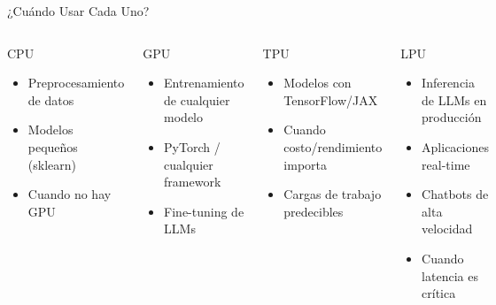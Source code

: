 \documentclass[aspectratio=169]{beamer}
\begin{document}
\begin{frame}{¿Cuándo Usar Cada Uno?}
    \begin{columns}[t]
        \begin{block}{CPU \faServer}
            \begin{itemize}
                \item Preprocesamiento de datos
                \item Modelos pequeños (sklearn)
                \item Cuando no hay GPU
            \end{itemize}
        \end{block}
        
        \begin{block}{GPU \faMicrochip}
            \begin{itemize}
                \item Entrenamiento de cualquier modelo
                \item PyTorch / cualquier framework
                \item Fine-tuning de LLMs
            \end{itemize}
        \end{block}
        
        \begin{block}{TPU \faGoogle}
            \begin{itemize}
                \item Modelos con TensorFlow/JAX
                \item Cuando costo/rendimiento importa
                \item Cargas de trabajo predecibles
            \end{itemize}
        \end{block}
        
        \begin{block}{LPU \faBolt}
            \begin{itemize}
                \item Inferencia de LLMs en producción
                \item Aplicaciones real-time
                \item Chatbots de alta velocidad
                \item Cuando latencia es crítica
            \end{itemize}
        \end{block}
    \end{columns}
\end{frame}
\end{document}
